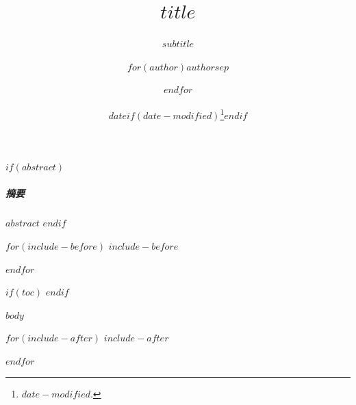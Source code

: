 \documentclass[fontset=fandol,$if(fontsize)$$fontsize$$endif$]{\mydocumentclass}
\title{$title$}
\subtitle{$subtitle$}
\author{$for(author)$$author$$sep$ \and $endfor$}
\date{$date$$if(date-modified)$\thanks{\transmodified \space $date-modified$.}$endif$}
\renewenvironment{abstract}{\subparagraph{摘要}\kaishu}{}
\theoremstyle{suncnthm}
\theoremstyle{definition}
\theoremstyle{remark}
\begin{document}
\maketitle

$if(abstract)$
\begin{abstract}
    $abstract$
\end{abstract}
$endif$

$for(include-before)$
$include-before$

$endfor$

$if(toc)$
\renewcommand*\contentsname{\transtoc}
\setcounter{tocdepth}{$toc-depth$ - 1} %
\tableofcontents
$endif$

$body$

\ifzh
  \printbibliography[title={参考文献}]
\else
  \printbibliography
\fi

$for(include-after)$
$include-after$

$endfor$
\end{document}
